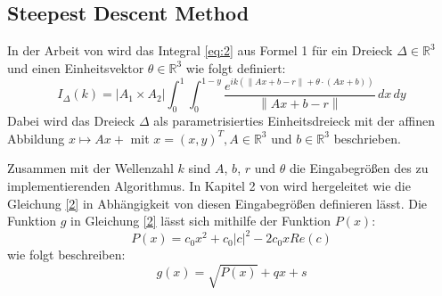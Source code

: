 \subsection{Steepest Descent Method}

In der Arbeit von \cite{gasperini:hal-03209144} wird das Integral \ref{eq:2} aus Formel 1 für ein Dreieck $\Delta \in \mathbb{R}^3$ und einen Einheitsvektor $\theta \in \mathbb{R}^3$ wie folgt definiert:
\begin{equation}
    I_{\Delta}(k) = | A_1 \times A_2 | \int_{0}^{1} \int_{0}^{1-y} \frac{e^{ik(\left\lVert Ax + b - r\right\rVert+\theta \cdot(Ax +b))}}{\left\lVert Ax + b - r\right\rVert }  \,dx \,dy 
\end{equation}
Dabei wird das Dreieck $\Delta$ als parametrisierties Einheitsdreieck mit der affinen Abbildung $x \mapsto Ax + $ mit $x = (x, y)^T, A \in \mathbb{R}^3$ und $b \in \mathbb{R}^3$ beschrieben.

Zusammen mit der Wellenzahl $k$ sind $A$, $b$, $r$ und $\theta$ die Eingabegrößen des zu implementierenden Algorithmus.
In Kapitel 2 von \cite*{gasperini:hal-03209144} wird hergeleitet wie die Gleichung \ref{2} in Abhängigkeit von diesen Eingabegrößen
definieren lässt.
Die Funktion $g$ in Gleichung \ref{2} lässt sich mithilfe der Funktion $P(x)$: 
\begin{equation}
    P(x) = c_0 x^2 + c_0|c|^2-2c_0xRe(c)
\end{equation}
wie folgt beschreiben:
\begin{equation}
    g(x) = \sqrt{P(x)} + qx + s
\end{equation}

 
